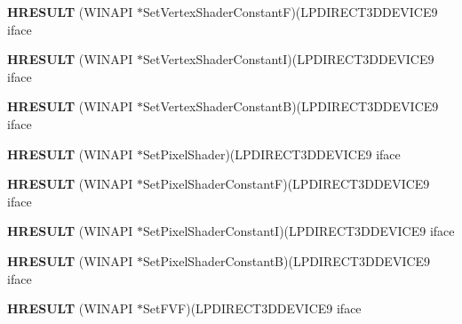 \begin{DoxyCompactItemize}
{\bfseries H\+R\+E\+S\+U\+LT} (W\+I\+N\+A\+PI $\ast$Set\+Vertex\+Shader\+ConstantF)(L\+P\+D\+I\+R\+E\+C\+T3\+D\+D\+E\+V\+I\+C\+E9 iface
\item 
\mbox{\label{struct___i_direct3_d_device9_vtbl___i_n_t_aebbe5fb4c3bd8c58ada9f2c98ae18774}} 
{\bfseries H\+R\+E\+S\+U\+LT} (W\+I\+N\+A\+PI $\ast$Set\+Vertex\+Shader\+ConstantI)(L\+P\+D\+I\+R\+E\+C\+T3\+D\+D\+E\+V\+I\+C\+E9 iface
\item 
\mbox{\label{struct___i_direct3_d_device9_vtbl___i_n_t_ac1ec5d3329ed7e92215acda2b96fa3e6}} 
{\bfseries H\+R\+E\+S\+U\+LT} (W\+I\+N\+A\+PI $\ast$Set\+Vertex\+Shader\+ConstantB)(L\+P\+D\+I\+R\+E\+C\+T3\+D\+D\+E\+V\+I\+C\+E9 iface
\item 
\mbox{\label{struct___i_direct3_d_device9_vtbl___i_n_t_a0d3703329a8a646278044f42ce6d75da}} 
{\bfseries H\+R\+E\+S\+U\+LT} (W\+I\+N\+A\+PI $\ast$Set\+Pixel\+Shader)(L\+P\+D\+I\+R\+E\+C\+T3\+D\+D\+E\+V\+I\+C\+E9 iface
\item 
\mbox{\label{struct___i_direct3_d_device9_vtbl___i_n_t_a8a1b13d2b6c869eb4f857c38e0eedc41}} 
{\bfseries H\+R\+E\+S\+U\+LT} (W\+I\+N\+A\+PI $\ast$Set\+Pixel\+Shader\+ConstantF)(L\+P\+D\+I\+R\+E\+C\+T3\+D\+D\+E\+V\+I\+C\+E9 iface
\item 
\mbox{\label{struct___i_direct3_d_device9_vtbl___i_n_t_a359363bdd342f493a73e2f60c90322ee}} 
{\bfseries H\+R\+E\+S\+U\+LT} (W\+I\+N\+A\+PI $\ast$Set\+Pixel\+Shader\+ConstantI)(L\+P\+D\+I\+R\+E\+C\+T3\+D\+D\+E\+V\+I\+C\+E9 iface
\item 
\mbox{\label{struct___i_direct3_d_device9_vtbl___i_n_t_afe6628c322495e9a9983edd74c1e1b16}} 
{\bfseries H\+R\+E\+S\+U\+LT} (W\+I\+N\+A\+PI $\ast$Set\+Pixel\+Shader\+ConstantB)(L\+P\+D\+I\+R\+E\+C\+T3\+D\+D\+E\+V\+I\+C\+E9 iface
\item 
\mbox{\label{struct___i_direct3_d_device9_vtbl___i_n_t_ab6d1ddc8ae08da72381520f433a56ca8}} 
{\bfseries H\+R\+E\+S\+U\+LT} (W\+I\+N\+A\+PI $\ast$Set\+F\+VF)(L\+P\+D\+I\+R\+E\+C\+T3\+D\+D\+E\+V\+I\+C\+E9 iface

\end{DoxyCompactItemize}
